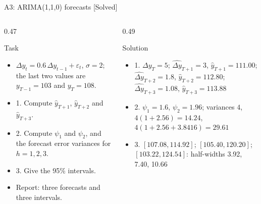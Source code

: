 \begin{frame}{A3: ARIMA(1,1,0) forecasts [Solved]}
\itemsize{\scriptsize}
\begin{columns}[T]
\begin{column}{0.47\textwidth}
\begin{block}{Task}
\begin{itemize}
    \item $\Delta y_t = 0.6\,\Delta y_{t-1} + \varepsilon_t$, $\sigma = 2$; the last two values are $y_{T-1} = 103$ and $y_T = 108$.
    \item 1. Compute $\hat y_{T+1}$, $\hat y_{T+2}$ and $\hat y_{T+3}$.
    \item 2. Compute $\psi_1$ and $\psi_2$, and the forecast error variances for $h = 1, 2, 3$.
    \item 3. Give the 95\% intervals.
    \item Report: three forecasts and three intervals.
\end{itemize}
\end{block}
\end{column}
\begin{column}{0.49\textwidth}
\begin{exampleblock}{Solution}
\begin{itemize}
    \item 1. $\Delta y_T = 5$; $\widehat{\Delta y}_{T+1} = 3$, $\hat y_{T+1} = 111.00$; $\widehat{\Delta y}_{T+2} = 1.8$, $\hat y_{T+2} = 112.80$; $\widehat{\Delta y}_{T+3} = 1.08$, $\hat y_{T+3} = 113.88$
    \item 2. $\psi_1 = 1.6$, $\psi_2 = 1.96$; variances $4$, $4(1 + 2.56) = 14.24$, $4(1 + 2.56 + 3.8416) = 29.61$
    \item 3. $[107.08, 114.92]$; $[105.40, 120.20]$; $[103.22, 124.54]$: half-widths 3.92, 7.40, 10.66
\end{itemize}
\end{exampleblock}
\end{column}
\end{columns}
\end{frame}

